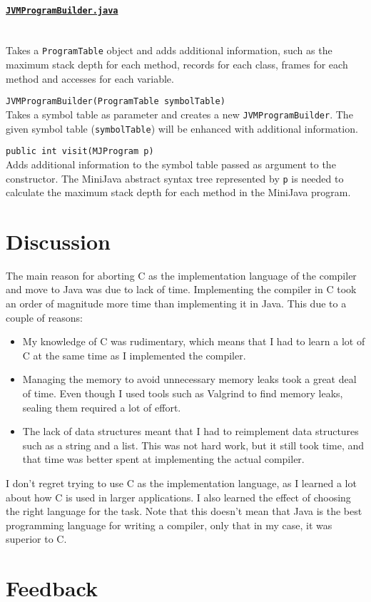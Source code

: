 \documentclass[11pt,oneside,a4paper]{article}
\newcommand{\code}[1]{\texttt{#1}}
\newcommand{\class}[1]{\underline{\texttt{#1}}}
\begin{document}
\paragraph{\class{JVMProgramBuilder.java}} \hfill \\
Takes a \code{ProgramTable} object and adds additional information, such as the
maximum stack depth for each method, records for each class, frames for each
method and accesses for each variable.
\label{par:JVMProgramBuilder}
\begin{description}
    \item{\code{JVMProgramBuilder(ProgramTable symbolTable)}} \hfill \\
        Takes a symbol table as parameter and creates a new
        \code{JVMProgramBuilder}. The given symbol table (\code{symbolTable})
        will be enhanced with additional information.
    \item{\code{public int visit(MJProgram p)}} \hfill \\
        Adds additional information to the symbol table passed as argument to
        the constructor. The MiniJava abstract syntax tree represented by
        \code{p} is needed to calculate the maximum stack depth for each method
        in the MiniJava program.
\end{description}

\section{Discussion}
\label{sec:discussion}
The main reason for aborting C as the implementation language of the compiler
and move to Java was due to lack of time. Implementing the compiler in C took 
an order of magnitude more time than implementing it in Java. This due to a 
couple of reasons:
\begin{itemize}
\item
    My knowledge of C was rudimentary, which means that I had to learn a lot of
    C at the same time as I implemented the compiler.
\item
    Managing the memory to avoid unnecessary memory leaks took a great deal of
    time. Even though I used tools such as Valgrind to find memory leaks,
    sealing them required a lot of effort.
\item
    The lack of data structures meant that I had to reimplement data structures
    such as a string and a list. This was not hard work, but it still
    took time, and that time was better spent at implementing the actual 
    compiler. 
\end{itemize}
I don't regret trying to use C as the implementation language, as I learned a
lot about how C is used in larger applications. I also learned the effect of
choosing the right language for the task. Note that this doesn't mean that Java 
is the best programming language for writing a compiler, 
only that in my case, it was superior to C.

\appendix
\section{Feedback}
\end{document}
